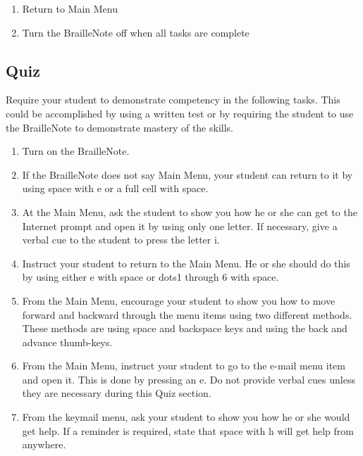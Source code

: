 \documentclass[10pt,letterpaper,twoside]{report}
\begin{document}
{{{\begin{enumerate}
\begin{itemize}
	        \item To select the Media Player, 
	        \item To select the FM Radio, 
	    \end{itemize}
    \item Return to Main Menu 
	\item Turn the BrailleNote off when all tasks are complete 
\end{enumerate}
\clearpage
\subsection{Quiz}
Require your student to demonstrate competency in the following tasks.  This could be accomplished by using a written test or by requiring the student to use the BrailleNote to demonstrate mastery of the skills.
\begin{enumerate}
	\item Turn on the BrailleNote.
	\item If the BrailleNote does not say Main Menu, your student can return to it by using space with e or a full cell with space.
	\item At the Main Menu, ask the student to show you how he or she can get to the Internet prompt and open it by using only one letter.  If necessary, give a verbal cue to the student to press the letter i.
	\item Instruct your student to return to the Main Menu.  He or she should do this by using either e with space or dots1 through 6 with space.
	\item From the Main Menu, encourage your student to show you how to move forward and backward through the menu items using two different methods.  These methods are using space and backspace keys and using the back and advance thumb-keys.
	\item From the Main Menu, instruct your student to go to the e-mail menu item and open it.  This is done by pressing an e.  Do not provide verbal cues unless they are necessary during this Quiz section.
	\item From the keymail menu, ask your student to show you how he or she would get help.  If a reminder is required, state that space with h will get help from anywhere.

\end{enumerate}}}}
\end{document}
